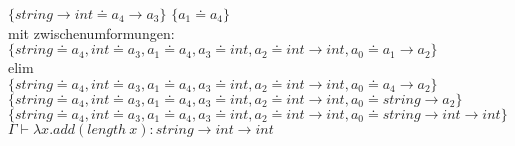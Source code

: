 \documentclass{article}
\begin{document}
	$\{string\to int\doteq a_4\to a_3\}$ $\{a_1\doteq a_4\}$\\
	mit zwischenumformungen:\\
	$\{string\doteq a_4, int\doteq a_3,a_1\doteq a_4, a_3\doteq int, a_2\doteq int\to int, a_0\doteq a_1\to a_2\}$\\
	elim\\
	$\{string\doteq a_4, int\doteq a_3,a_1\doteq a_4, a_3\doteq int, a_2\doteq int\to int, a_0\doteq a_4\to a_2\}$\\
	$\{string\doteq a_4, int\doteq a_3,a_1\doteq a_4, a_3\doteq int, a_2\doteq int\to int, a_0\doteq string\to a_2\}$\\
	$\{string\doteq a_4, int\doteq a_3,a_1\doteq a_4, a_3\doteq int, a_2\doteq int\to int, a_0\doteq string\to int\to int\}$\\
	$\Gamma\vdash \lambda x.add(length\ x): string\to int \to int$\\
	
\end{document}
